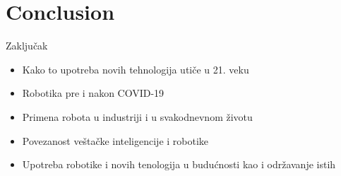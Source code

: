 \documentclass{beamer}
\begin{document}
\section{Conclusion}
\begin{frame}{Zaključak}
    \begin{itemize}                                            
    \item Kako to upotreba novih tehnologija utiče u 21. veku
    \item Robotika pre i nakon COVID-19
    \item Primena robota u industriji i u svakodnevnom životu
    \item Povezanost veštačke inteligencije i robotike
    \item Upotreba robotike i novih tenologija u budućnosti kao i održavanje istih

\end{itemize}
\end{frame}
\end{document}
